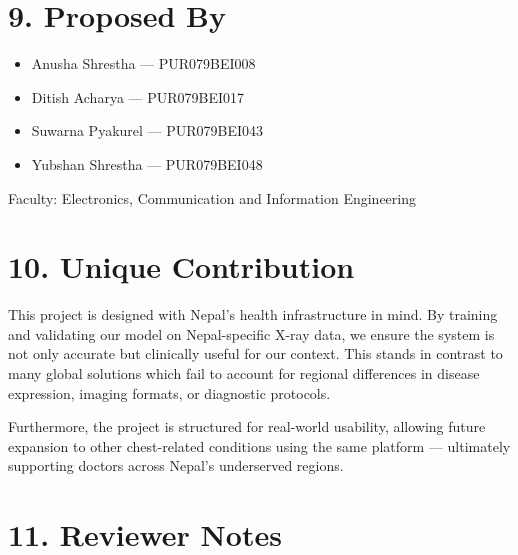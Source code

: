 \documentclass[12pt]{article}
\begin{document}
\section*{9. Proposed By}
\begin{itemize}
  
  \item Anusha Shrestha — PUR079BEI008
  \item Ditish Acharya — PUR079BEI017
  \item Suwarna Pyakurel — PUR079BEI043
  \item Yubshan Shrestha — PUR079BEI048
\end{itemize}

\noindent Faculty: Electronics, Communication and Information Engineering

\section*{10. Unique Contribution}
This project is designed with Nepal’s health infrastructure in mind. By training and validating our model on Nepal-specific X-ray data, we ensure the system is not only accurate but clinically useful for our context. This stands in contrast to many global solutions which fail to account for regional differences in disease expression, imaging formats, or diagnostic protocols.

Furthermore, the project is structured for real-world usability, allowing future expansion to other chest-related conditions using the same platform — ultimately supporting doctors across Nepal’s underserved regions.


\section*{11. Reviewer Notes}
\vspace{2cm} %
\end{document}
